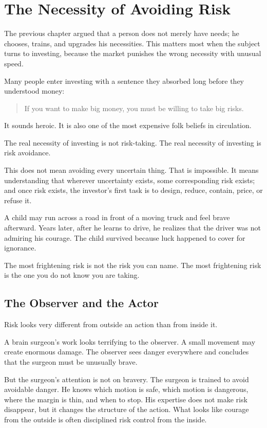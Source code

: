 \chapter{The Necessity of Avoiding Risk}

The previous chapter argued that a person does not merely have needs; he chooses, trains, and upgrades his necessities. This matters most when the subject turns to investing, because the market punishes the wrong necessity with unusual speed.

Many people enter investing with a sentence they absorbed long before they understood money:

\begin{quote}
If you want to make big money, you must be willing to take big risks.
\end{quote}

It sounds heroic. It is also one of the most expensive folk beliefs in circulation.

The real necessity of investing is not risk-taking. The real necessity of investing is risk avoidance.

This does not mean avoiding every uncertain thing. That is impossible. It means understanding that wherever uncertainty exists, some corresponding risk exists; and once risk exists, the investor's first task is to design, reduce, contain, price, or refuse it.

A child may run across a road in front of a moving truck and feel brave afterward. Years later, after he learns to drive, he realizes that the driver was not admiring his courage. The child survived because luck happened to cover for ignorance.

The most frightening risk is not the risk you can name. The most frightening risk is the one you do not know you are taking.

\section*{The Observer and the Actor}

Risk looks very different from outside an action than from inside it.

A brain surgeon's work looks terrifying to the observer. A small movement may create enormous damage. The observer sees danger everywhere and concludes that the surgeon must be unusually brave.

But the surgeon's attention is not on bravery. The surgeon is trained to avoid avoidable danger. He knows which motion is safe, which motion is dangerous, where the margin is thin, and when to stop. His expertise does not make risk disappear, but it changes the structure of the action. What looks like courage from the outside is often disciplined risk control from the inside.


